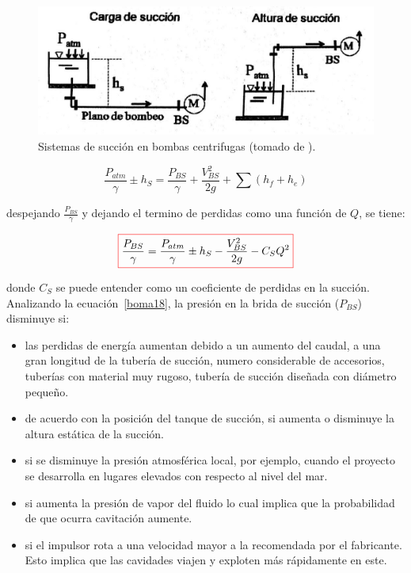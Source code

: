 \documentclass[11pt, oneside]{article}
\begin{document}
\begin{figure}[h]
\centering
\includegraphics[width=12cm]{./figs/bom12.jpeg}
\caption{Sistemas de succi\'on en bombas centrifugas (tomado de \cite{agudelo2011mecanica}).} 
\label{bom18}
\end{figure}

\begin{equation}
\frac{P_{atm}}{\gamma} \pm h_S = \frac{P_{BS}}{\gamma} + \frac{V_{BS}^2}{2g} + \sum \left(h_f + h_e \right)
\label{boma17}
\end{equation}

despejando $\frac{P_{BS}}{\gamma}$ y dejando el termino de perdidas como una funci\'on de $Q$, se tiene:

\begin{equation}
\color{red}\boxed{\color{black} \frac{P_{BS}}{\gamma} = \frac{P_{atm}}{\gamma} \pm h_S - \frac{V_{BS}^2}{2g} - C_S Q^2 }
\label{boma18}
\end{equation}

donde $C_S$ se puede entender como un coeficiente de perdidas en la succi\'on. Analizando la ecuaci\'on~\ref{boma18}, la presi\'on en la brida de succi\'on ($P_{BS}$) disminuye si:
\begin{itemize}
\item las perdidas de energ\'ia aumentan debido a un aumento del caudal, a una gran longitud de la tuber\'ia de succi\'on, numero considerable de accesorios, tuber\'ias con material muy rugoso, tuber\'ia de succi\'on dise\~nada con di\'ametro peque\~no.
\item de acuerdo con la posici\'on del tanque de succi\'on, si aumenta o disminuye la altura est\'atica de la succi\'on.
\item si se disminuye la presi\'on atmosf\'erica  local, por ejemplo, cuando el proyecto se desarrolla en lugares elevados con respecto al nivel del mar. 
\item si aumenta la presi\'on de vapor del fluido lo cual implica que la probabilidad de que ocurra cavitaci\'on aumente. 
\item si el impulsor rota a una velocidad mayor a la recomendada por el fabricante. Esto implica que las cavidades viajen y exploten m\'as r\'apidamente en este.  
\end{itemize}
\end{document}
